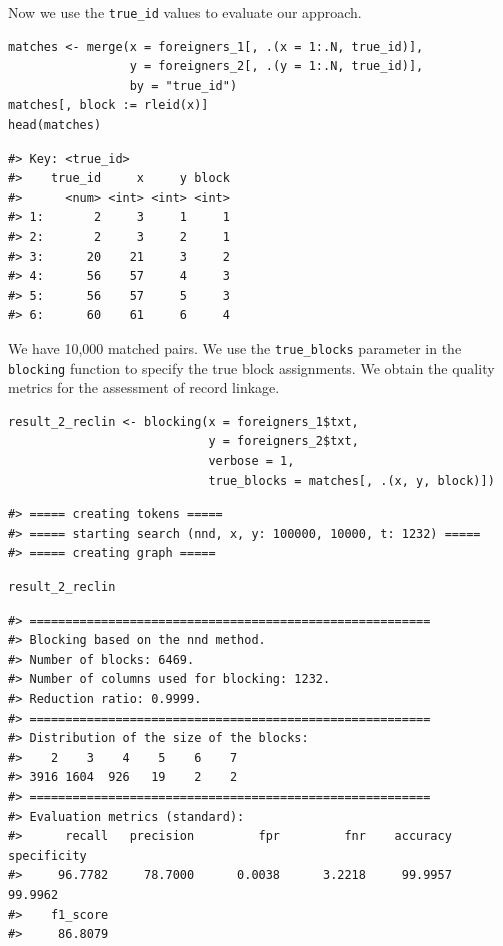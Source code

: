 Now we use the \texttt{true\_id} values to evaluate our approach.

\begin{verbatim}
matches <- merge(x = foreigners_1[, .(x = 1:.N, true_id)],
                 y = foreigners_2[, .(y = 1:.N, true_id)],
                 by = "true_id")
matches[, block := rleid(x)]
head(matches)
\end{verbatim}

\begin{verbatim}
#> Key: <true_id>
#>    true_id     x     y block
#>      <num> <int> <int> <int>
#> 1:       2     3     1     1
#> 2:       2     3     2     1
#> 3:      20    21     3     2
#> 4:      56    57     4     3
#> 5:      56    57     5     3
#> 6:      60    61     6     4
\end{verbatim}

We have 10,000 matched pairs. We use the \texttt{true\_blocks} parameter in the \texttt{blocking} function to specify the true block assignments. We obtain the quality metrics for the assessment of record linkage.

\begin{verbatim}
result_2_reclin <- blocking(x = foreigners_1$txt,
                            y = foreigners_2$txt,
                            verbose = 1,
                            true_blocks = matches[, .(x, y, block)])
\end{verbatim}

\begin{verbatim}
#> ===== creating tokens =====
#> ===== starting search (nnd, x, y: 100000, 10000, t: 1232) =====
#> ===== creating graph =====
\end{verbatim}

\begin{verbatim}
result_2_reclin
\end{verbatim}

\begin{verbatim}
#> ========================================================
#> Blocking based on the nnd method.
#> Number of blocks: 6469.
#> Number of columns used for blocking: 1232.
#> Reduction ratio: 0.9999.
#> ========================================================
#> Distribution of the size of the blocks:
#>    2    3    4    5    6    7 
#> 3916 1604  926   19    2    2 
#> ========================================================
#> Evaluation metrics (standard):
#>      recall   precision         fpr         fnr    accuracy specificity 
#>     96.7782     78.7000      0.0038      3.2218     99.9957     99.9962 
#>    f1_score 
#>     86.8079
\end{verbatim}

